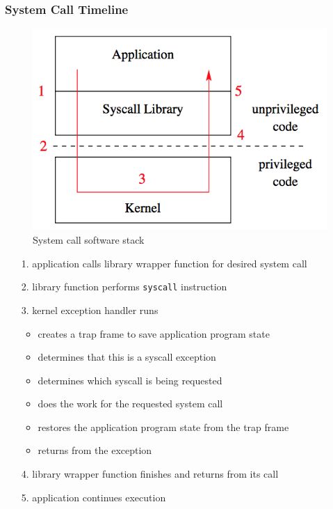 \documentclass[12pt]{article}
\theoremstyle{plain}
\theoremstyle{definition}
\begin{document}
\subsubsection{System Call Timeline}
\begin{figure}[H]
  \centering
  \includegraphics[scale=0.39]{pictures/syscall_stack.png}
  \caption{System call software stack}
  \label{fig:syscall_stack}
\end{figure}
\begin{enumerate}
  \item[1.] application calls library wrapper function for desired system call
  \item[2.] library function performs \texttt{syscall} instruction
  \item[3.] kernel exception handler runs
  \begin{itemize}
    \item creates a trap frame to save application program state
    \item determines that this is a syscall exception
    \item determines which syscall is being requested
    \item does the work for the requested system call
    \item restores the application program state from the trap frame
    \item returns from the exception
  \end{itemize}
  \item[4.] library wrapper function finishes and returns from its call
  \item[5.] application continues execution
\end{enumerate}
\end{document}
